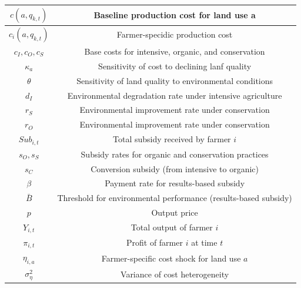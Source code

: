 \documentclass{article}
\begin{document}
\begin{table} [hbt!]
\begin{tabular}{|c|c|}
$c(a, q_{k,t})$&Baseline production cost for land use a\\\hline
 $c_i(a, q_{k,t})$&Farmer-specidic production cost\\\hline
 $c_I, c_O, c_S$&Base costs for intensive, organic, and conservation\\\hline
 $\kappa_a$&Sensitivity of cost to declining lanf quality\\\hline
 $\theta$&Sensitivity of land quality to environmental conditions\\\hline
 $d_I $&Environmental degradation rate under intensive agriculture\\ \hline
 $r_S$&Environmental improvement rate under conservation\\\hline
 $r_O$&Environmental improvement rate under conservation\\\hline
 $Sub_{i,t}$&Total subsidy received by farmer $i$\\\hline
 $s_O, s_S$&Subsidy rates for organic and conservation practices\\\hline
 $s_C$&Conversion subsidy (from intensive to organic)\\\hline
 $\beta$&Payment rate for results-based subsidy\\\hline
 $\bar B$&Threshold for environmental performance (results-based subsidy)\\\hline
 $p$&Output price\\\hline
 $Y_{i,t}$&Total output of farmer $i$\\\hline
 $\pi_{i,t}$&Profit of farmer $i$ at time $t$\\\hline
 $\eta_{i, a}$&Farmer-specific cost shock for land use $a$\\\hline
 $\sigma_\eta^2$&Variance of cost heterogeneity\\\hline
    \end{tabular}


    
    
\end{table}
\end{document}
